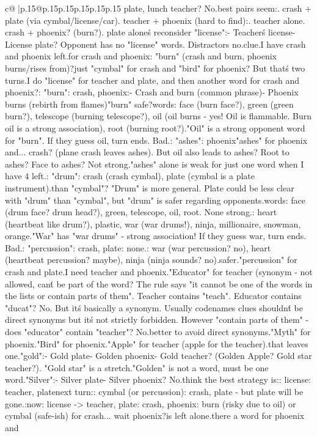 \documentclass{article}
\begin{document}
{\begin{supertabular}{c@{$\;$}|p{.15\linewidth}@{}p{.15\linewidth}p{.15\linewidth}p{.15\linewidth}p{.15\linewidth}p{.15\linewidth}}
{{{plate, lunch teacher? No.\n\nSo best pairs seem:. crash + plate (via cymbal/license/car). teacher + phoenix (hard to find)\n\nOr:. teacher alone. crash + phoenix? (burn?). plate alone\n\nLet\'s reconsider "license":\n- Teacher\'s license\n- License plate\nSafe? Opponent has no "license" words. Distractors no.\nGood clue.\n\nThen I have crash and phoenix left.\nClue for crash and phoenix: "burn" (crash and burn, phoenix burns/rises from)?\nOr just "cymbal" for crash and "bird" for phoenix? But that\'s two turns.\n\nCan I do "license" for teacher and plate, and then another word for crash and phoenix?\n\nClue: "burn"\nTARGETS: crash, phoenix\nAssociations:\n- Crash and burn (common phrase)\n- Phoenix burns (rebirth from flames)\nIs "burn" safe?\nOpponent words: face (burn face?), green (green burn?), telescope (burning telescope?), oil (oil burns - yes! Oil is flammable. Burn oil is a strong association), root (burning root?).\n"Oil" is a strong opponent word for "burn". If they guess oil, turn ends. Bad.\n\nClue: "ashes"\nTARGETS: phoenix\nOr "ashes" for phoenix and... crash? (plane crash leaves ashes). But oil also leads to ashes? Root to ashes? Face to ashes? Not strong.\nBut "ashes" alone is weak for just one word when I have 4 left.\n\nClue: "drum"\nTARGETS: crash (crash cymbal), plate (cymbal is a plate instrument).\nSafer than "cymbal"? "Drum" is more general. Plate could be less clear with "drum" than "cymbal", but "drum" is safer regarding opponents.\nOpponent words: face (drum face? drum head?), green, telescope, oil, root. None strong.\nDistractors: heart (heartbeat like drum?), plastic, war (war drums!), ninja, millionaire, snowman, orange.\n"War" has "war drums" - strong association! If they guess war, turn ends. Bad.\n\nClue: "percussion"\nTARGETS: crash, plate\nOpponent: none.\nDistractor: war (war percussion? no), heart (heartbeat percussion? maybe), ninja (ninja sounds? no).\nSeems safer.\n\nSo "percussion" for crash and plate.\n\nThen I need teacher and phoenix.\n"Educator" for teacher (synonym - not allowed, can\'t be part of the word? The rule says "it cannot be one of the words in the lists or contain parts of them". Teacher contains "teach". Educator contains "ducat"? No. But it\'s basically a synonym. Usually codenames clues shouldn\'t be direct synonyms but it\'s not strictly forbidden. However "contain parts of them" - does "educator" contain "teacher"? No.\nBut better to avoid direct synonyms.\n\n"Myth" for phoenix.\n"Bird" for phoenix.\n"Apple" for teacher (apple for the teacher).\nBut that leaves one.\n\nMaybe "gold":\n- Gold plate\n- Golden phoenix\n- Gold teacher? (Golden Apple? Gold star teacher?). "Gold star" is a stretch.\n"Golden" is not a word, must be one word.\n\n"Silver":\n- Silver plate\n- Silver phoenix? No.\n\nI think the best strategy is:\nCLUE: license\nTARGETS: teacher, plate\n\nThen next turn:\nCLUE: cymbal (or percussion)\nTARGETS: crash, plate - but plate will be gone.\n\nSo:\nTurn now: license -> teacher, plate\nRemaining: crash, phoenix\nThen: burn (risky due to oil) or cymbal (safe-ish) for crash... wait phoenix?\nPhoenix is left alone.\n\nIs there a word for phoenix and }}}
\end{supertabular}}
\end{document}
